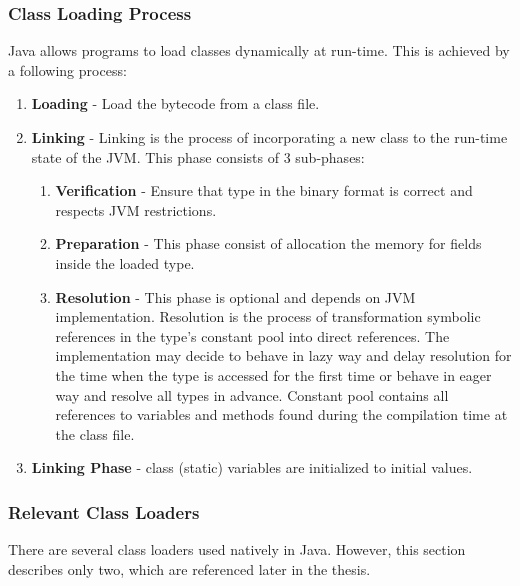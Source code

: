 \subsubsection{Class Loading Process}
Java allows programs to load classes dynamically at run-time. This is achieved by a following process:
\begin{enumerate}
	\item \textbf{Loading} - Load the bytecode from a class file.
	\item \textbf{Linking} - Linking is the process of incorporating a new class to the run-time state of the JVM. This phase consists of 3 sub-phases:
	\begin{enumerate}
		\item \textbf{Verification} - Ensure that type in the binary format is correct and respects JVM restrictions.
		\item \textbf{Preparation} - This phase consist of allocation the memory for fields inside the loaded type.
		\item \textbf{Resolution} - This phase is optional and depends on JVM implementation. Resolution is the process of transformation symbolic references in the type's constant pool into direct references. The implementation may decide to behave in lazy way and delay resolution for the time when the type is accessed for the first time or behave in eager way and resolve all types in advance. Constant pool contains all references to variables and methods found during the compilation time at the class file.
	\end{enumerate}
	\item \textbf{Linking Phase} - class (static) variables are initialized to initial values.
\end{enumerate}
\subsubsection{Relevant Class Loaders}
There are several class loaders used natively in Java. However, this section describes only two, which are referenced later in the thesis. 

